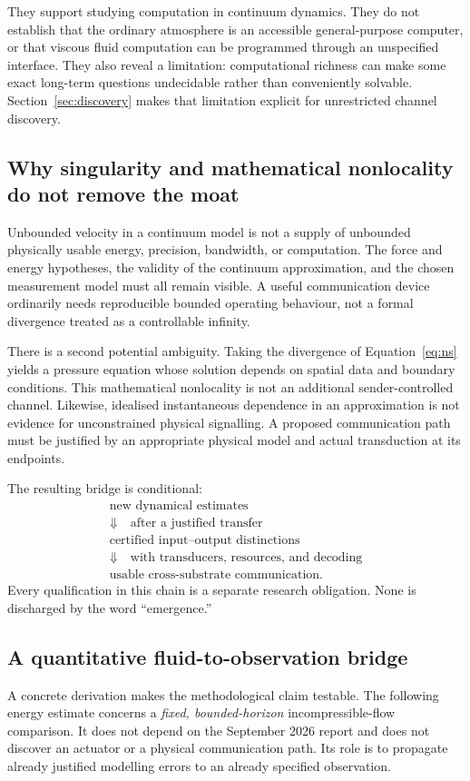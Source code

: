 \documentclass[11pt,a4paper]{article}
\theoremstyle{definition}
\theoremstyle{remark}
\begin{document}
They support studying computation in continuum dynamics. They do not establish that the ordinary atmosphere is an accessible general-purpose computer, or that viscous fluid computation can be programmed through an unspecified interface. They also reveal a limitation: computational richness can make some exact long-term questions undecidable rather than conveniently solvable. Section~\ref{sec:discovery} makes that limitation explicit for unrestricted channel discovery.

\subsection{Why singularity and mathematical nonlocality do not remove the moat}
Unbounded velocity in a continuum model is not a supply of unbounded physically usable energy, precision, bandwidth, or computation. The force and energy hypotheses, the validity of the continuum approximation, and the chosen measurement model must all remain visible. A useful communication device ordinarily needs reproducible bounded operating behaviour, not a formal divergence treated as a controllable infinity.

There is a second potential ambiguity. Taking the divergence of Equation~\eqref{eq:ns} yields a pressure equation whose solution depends on spatial data and boundary conditions. This mathematical nonlocality is not an additional sender-controlled channel. Likewise, idealised instantaneous dependence in an approximation is not evidence for unconstrained physical signalling. A proposed communication path must be justified by an appropriate physical model and actual transduction at its endpoints.

The resulting bridge is conditional:
\begin{equation}\label{eq:bridge}
\begin{gathered}
 \text{new dynamical estimates}\\
 \Downarrow\quad\text{after a justified transfer}\\
 \text{certified input--output distinctions}\\
 \Downarrow\quad\text{with transducers, resources, and decoding}\\
 \text{usable cross-substrate communication}.
\end{gathered}
\end{equation}
Every qualification in this chain is a separate research obligation. None is discharged by the word ``emergence.''

\subsection{A quantitative fluid-to-observation bridge}\label{sec:nsresidual}
A concrete derivation makes the methodological claim testable. The following energy estimate concerns a \emph{fixed, bounded-horizon} incompressible-flow comparison. It does not depend on the September 2026 report and does not discover an actuator or a physical communication path. Its role is to propagate already justified modelling errors to an already specified observation.
\end{document}
